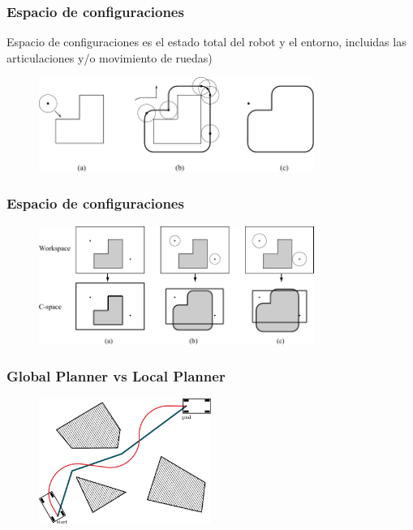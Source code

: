 \begin{frame}
	\frametitle{Espacio de configuraciones}

	Espacio de configuraciones es el estado total del robot y el entorno, incluidas las articulaciones y/o movimiento de ruedas)
	
	\begin{figure}[!h]
		\includegraphics[width=0.8\textwidth]{images/configuration_space_obstacle.pdf}
	\end{figure}
	
\end{frame}

\begin{frame}
	\frametitle{Espacio de configuraciones}
	
	\begin{figure}[!h]
		\includegraphics[width=0.8\textwidth]{images/workspace_configuration_space.pdf}
	\end{figure}
	
\end{frame}



\begin{frame}
	\frametitle{Global Planner vs Local Planner}
	
	\begin{figure}[!h]
		\includegraphics[width=0.5\textwidth]{images/global_local_plan.pdf}
	\end{figure}
	
\end{frame}

